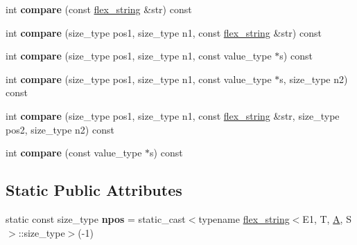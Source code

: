 \begin{DoxyCompactItemize}
\item 
\hypertarget{classflex__string_a08d9da3dd77f83afc7ed617f4638d1ca}{}int {\bfseries compare} (const \hyperlink{classflex__string}{flex\+\_\+string} \&str) const \label{classflex__string_a08d9da3dd77f83afc7ed617f4638d1ca}

\item 
\hypertarget{classflex__string_a3299051537691e90b36f0dcb01395443}{}int {\bfseries compare} (size\+\_\+type pos1, size\+\_\+type n1, const \hyperlink{classflex__string}{flex\+\_\+string} \&str) const \label{classflex__string_a3299051537691e90b36f0dcb01395443}

\item 
\hypertarget{classflex__string_a3ee42b128e0450d66aa78d7a26d85b39}{}int {\bfseries compare} (size\+\_\+type pos1, size\+\_\+type n1, const value\+\_\+type $\ast$s) const \label{classflex__string_a3ee42b128e0450d66aa78d7a26d85b39}

\item 
\hypertarget{classflex__string_a323cc7aeba7842b15b4315ae4213db2e}{}int {\bfseries compare} (size\+\_\+type pos1, size\+\_\+type n1, const value\+\_\+type $\ast$s, size\+\_\+type n2) const \label{classflex__string_a323cc7aeba7842b15b4315ae4213db2e}

\item 
\hypertarget{classflex__string_a8d650141091a4ab1cba2240a80e1344f}{}int {\bfseries compare} (size\+\_\+type pos1, size\+\_\+type n1, const \hyperlink{classflex__string}{flex\+\_\+string} \&str, size\+\_\+type pos2, size\+\_\+type n2) const \label{classflex__string_a8d650141091a4ab1cba2240a80e1344f}

\item 
\hypertarget{classflex__string_a57ea4129a7a1f912db84959733d5bd09}{}int {\bfseries compare} (const value\+\_\+type $\ast$s) const \label{classflex__string_a57ea4129a7a1f912db84959733d5bd09}

\end{DoxyCompactItemize}
\subsection*{Static Public Attributes}
\begin{DoxyCompactItemize}
\item 
\hypertarget{classflex__string_a6de8d81894f55dfcfe0311c2f7674bd5}{}static const size\+\_\+type {\bfseries npos} = static\+\_\+cast$<$typename \hyperlink{classflex__string}{flex\+\_\+string}$<$E1, T, \hyperlink{structA}{A}, S$>$\+::size\+\_\+type$>$(-\/1)\label{classflex__string_a6de8d81894f55dfcfe0311c2f7674bd5}

\end{DoxyCompactItemize}
